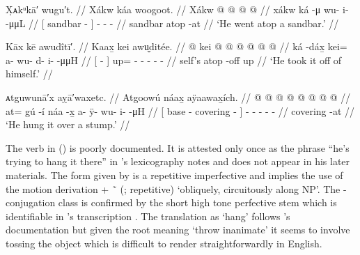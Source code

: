 \ex\label{ex:91-216-went-atop-sandbar}%
%
\begingl
	\glpreamble	X̣ᴀkᵘkā′ wugu′t. //
	\glpreamble	Xákw káa woogoot. //
	\gla	{} Xákw  @ {} {}  @ {} @ {} @ {} //
	\glb	{} xákw ká -μ {} wu- i-  -μμL //
	\glc	{}[ sandbar  - {}]
		- -  - //
	\gld	{} sandbar atop -at {}  {} {} {} //
	\glft	‘He went atop a sandbar.’
		//
\endgl
\xe

\ex\label{ex:91-217-take-off-self}%
%
\begingl
	\glpreamble	Kāx kē awudîtī′. //
	\glpreamble	Kaax̱ kei awu̬ditée. //
	\gla	{} {}  @ {} {}
		kei @  @ {} @ {} @ {} @ {} @ {} //
	\glb	{} {} ká -dáx̱ {}
		kei= a- wu- d- i-  -μμH //
	\glc	{}[   - {}]
		up= - - - -  - //
	\gld	{} self’s atop -off {}
		up  {} {} {} {} {} //
	\glft	‘He took it off of himself.’
		//
\endgl
\xe

\ex\label{ex:91-218-hang-on-stump}%
%
\begingl
	\glpreamble	ᴀtguwunā′x aỵā′waxetc. //
	\glpreamble	Atgoowú náax̱ aÿaawax̱ích. //
	\gla	{}  @ {} @ {}  @ {} {}
		 @ {} @ {} @ {} @ {} @ {} //
	\glb	{} at= gú -í náa -x̱ {}
		a- ÿ- wu- i-  -μH //
	\glc	{}[  base - covering - {}]
		- - - -  - //
	\gld	{}  {} {} covering -at {}
		 {} {} {} {} {} //
	\glft	‘He hung it over a stump.’
		//
\endgl
\xe

The verb  in (\lastx) is poorly documented.
It is attested only once as the phrase  “he’s trying to hang it there” in \citeauthor{leer:1973}’s lexicography notes \parencite[f02/59]{leer:1973} and does not appear in his later materials.
The form given by \citeauthor{leer:1973} is a repetitive imperfective and implies the use of the motion derivation  +  \~\  (;  repetitive) ‘obliquely, circuitously along NP’.
The -conjugation class is confirmed by the short high tone perfective stem  which is identifiable in \citeauthor{swanton:1909}’s transcription .
The translation as ‘hang’ follows \citeauthor{leer:1973}’s documentation but given the root  meaning ‘throw inanimate’ it seems to involve tossing the object which is difficult to render straightforwardly in English.


